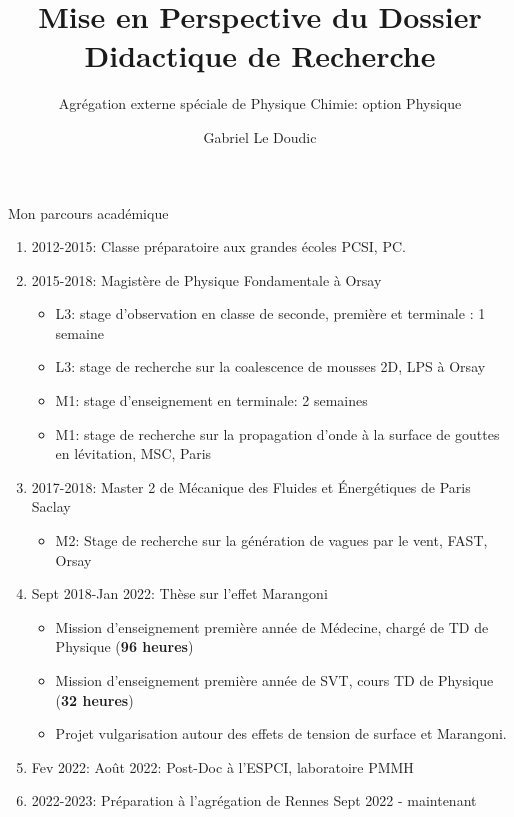 \documentclass[aspectratio=169,10pt]{beamer}
\title{Mise en Perspective du Dossier Didactique de Recherche}
\subtitle{Agrégation externe spéciale de Physique Chimie: option Physique}
\author{\large Gabriel Le Doudic}
\date{}
\begin{document}
\maketitle
\begin{frame}{Mon parcours académique}
    \begin{enumerate}
        \item 2012-2015: Classe préparatoire aux grandes écoles PCSI, PC.
        \item  2015-2018: Magistère de Physique Fondamentale à Orsay
        \begin{itemize}
            \item L3: stage d'observation en classe de seconde, première et terminale : 1 semaine
            \item L3: stage de recherche sur la coalescence de mousses 2D, LPS à Orsay
            \item M1: stage d'enseignement en terminale: 2 semaines
            \item M1: stage de recherche sur la propagation d'onde à la surface de gouttes en lévitation, MSC, Paris
        \end{itemize}
        \item 2017-2018: Master 2 de Mécanique des Fluides et Énergétiques de Paris Saclay
       
        \begin{itemize}
            \item M2: Stage de recherche sur la génération de vagues par le vent, FAST, Orsay
        \end{itemize}

        \item Sept 2018-Jan 2022: Thèse sur l'effet Marangoni
        \begin{itemize}
            \item Mission d'enseignement première année de Médecine, chargé de TD de Physique (\textbf{96 heures})
            \item Mission d'enseignement première année de SVT, cours TD de Physique (\textbf{32 heures})
            \item Projet vulgarisation autour des effets de tension de surface et Marangoni.
        \end{itemize}
        \item Fev 2022: Août 2022: Post-Doc à l'ESPCI, laboratoire PMMH
        \item 2022-2023: Préparation à l'agrégation de Rennes Sept 2022 - maintenant 
    \end{enumerate}
\end{frame}
\end{document}
